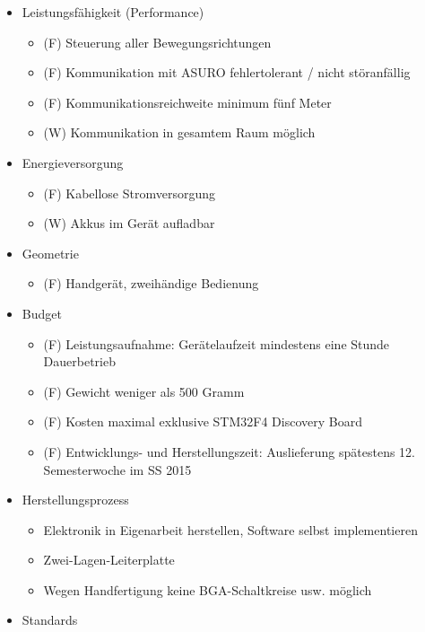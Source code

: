 \begin{itemize}
\item Leistungsfähigkeit (Performance)
	\begin{itemize}
		\item (F) Steuerung aller Bewegungsrichtungen
		\item (F) Kommunikation mit ASURO fehlertolerant / nicht störanfällig
		\item (F) Kommunikationsreichweite minimum fünf Meter
		\item (W) Kommunikation in gesamtem Raum möglich
	\end{itemize}
\item Energieversorgung
	\begin{itemize}
		\item (F) Kabellose Stromversorgung
		\item (W) Akkus im Gerät aufladbar
	\end{itemize}
\item Geometrie
	\begin{itemize}
		\item (F) Handgerät, zweihändige Bedienung
	\end{itemize}
\item Budget
	\begin{itemize}
		\item (F) Leistungsaufnahme: Gerätelaufzeit mindestens eine Stunde Dauerbetrieb
	\end{itemize}
	\begin{itemize}
		\item (F) Gewicht weniger als 500 Gramm
	\end{itemize}
	\begin{itemize}
		\item (F) Kosten maximal  exklusive STM32F4 Discovery Board
	\end{itemize}
	\begin{itemize}
		\item (F) Entwicklungs- und Herstellungszeit: Auslieferung spätestens 12. Semesterwoche im SS 2015
	\end{itemize}
\item Herstellungsprozess
	\begin{itemize}
		\item Elektronik in Eigenarbeit herstellen, Software selbst implementieren
		\item Zwei-Lagen-Leiterplatte
		\item Wegen Handfertigung keine BGA-Schaltkreise usw. möglich
	\end{itemize}
\item Standards

\end{itemize}
